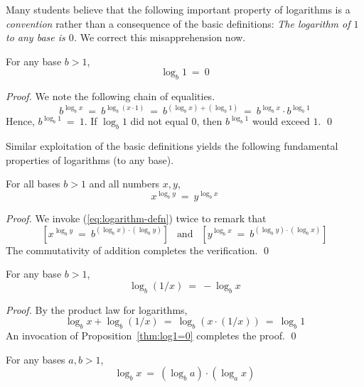 \bigskip

Many students believe that the following important property of
logarithms is a {\em convention} rather than a consequence of the
basic definitions: {\em The logarithm of $1$ to any base is $0$.}  We
correct this misapprehension now.

\begin{prop}
\label{thm:log1=0}
For any base $b >1$,
\[ \log_b 1 \ = \ 0 \]
\end{prop}

\begin{proof}
We note the following chain of equalities.
\[  b^{\log_b x} \ = \ b^{\log_b (x \cdot 1)} 
\ = \ b^{(\log_b x) + (\log_b 1)} 
\ = \ b^{\log_b x} \cdot b^{\log_b 1}
\]
Hence, $b^{\log_b 1} \ = \ 1$.  If $\log_b 1$ did not equal $0$, then
$b^{\log_b 1}$ would exceed $1$.  \qed
\end{proof}

Similar exploitation of the basic definitions yields the following
fundamental properties of logarithms (to any base).

\begin{prop}
For all bases $b > 1$ and all numbers $x, y$,
\[ x^{\log_b y} \ = \ y^{\log_b x} \]
\end{prop}

\begin{proof}
We invoke (\ref{eq:logarithm-defn}) twice to remark that
\[ \left[x^{\log_b y} \ = \ b^{(\log_b x) \cdot (\log_b y)}\right]
\ \ \mbox{ and } \ \ 
\left[y^{\log_b x}\ = \ b^{(\log_b y) \cdot (\log_b x)}\right] \]
The commutativity of addition completes the verification.  \qed
\end{proof}

\begin{prop}
For any base $b >1$,
\[ \log_b (1/x) \ = \ - \log_b x \]
\end{prop}

\begin{proof}
By the product law for logarithms,
\[ \log_b x + \log_b (1/x) \ = \ \log_b (x \cdot (1/x))
\  = \ \log_b 1
\]
An invocation of Proposition~\ref{thm:log1=0} completes the proof.
\qed
\end{proof}

\begin{prop}
For any bases $a, b >1$,
\begin{equation}
\label{eq:log-exp-0}
\log_b x \ = \ \left(\log_b a \right) \cdot \left( \log_a x \right)
\end{equation}
\end{prop}

